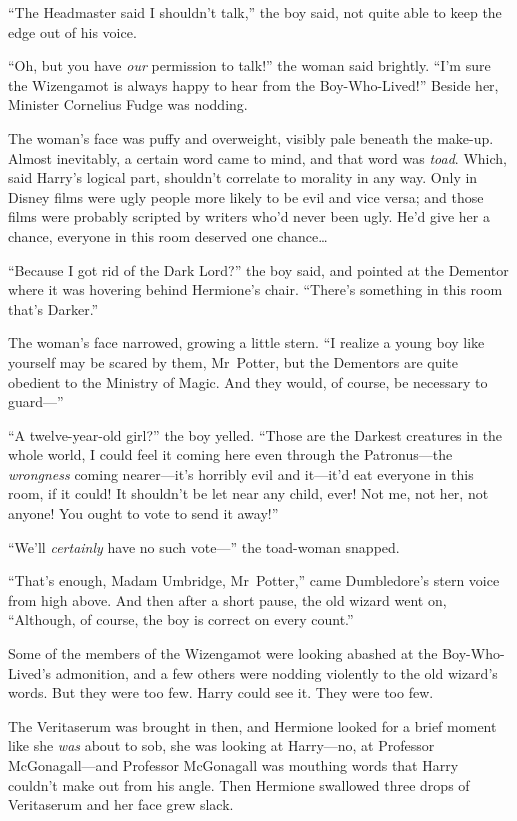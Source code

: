 “The Headmaster said I shouldn’t talk,” the boy said, not quite able to keep the edge out of his voice.

“Oh, but you have \emph{our} permission to talk!” the woman said brightly. “I’m sure the Wizengamot is always happy to hear from the Boy-Who-Lived!” Beside her, Minister Cornelius Fudge was nodding.

The woman’s face was puffy and overweight, visibly pale beneath the make-up. Almost inevitably, a certain word came to mind, and that word was \emph{toad}. Which, said Harry’s logical part, shouldn’t correlate to morality in any way. Only in Disney films were ugly people more likely to be evil and vice versa; and those films were probably scripted by writers who’d never been ugly. He’d give her a chance, everyone in this room deserved one chance…

“Because I got rid of the Dark Lord?” the boy said, and pointed at the Dementor where it was hovering behind Hermione’s chair. “There’s something in this room that’s Darker.”

The woman’s face narrowed, growing a little stern. “I realize a young boy like yourself may be scared by them, Mr~Potter, but the Dementors are quite obedient to the Ministry of Magic. And they would, of course, be necessary to guard—”

“A twelve-year-old girl?” the boy yelled. “Those are the Darkest creatures in the whole world, I could feel it coming here even through the Patronus—the \emph{wrongness} coming nearer—it’s horribly evil and it—it’d eat everyone in this room, if it could! It shouldn’t be let near any child, ever! Not me, not her, not anyone! You ought to vote to send it away!”

“We’ll \emph{certainly} have no such vote—” the toad-woman snapped.

“That’s enough, Madam Umbridge, Mr~Potter,” came Dumbledore’s stern voice from high above. And then after a short pause, the old wizard went on, “Although, of course, the boy is correct on every count.”

Some of the members of the Wizengamot were looking abashed at the Boy-Who-Lived’s admonition, and a few others were nodding violently to the old wizard’s words. But they were too few. Harry could see it. They were too few.

The Veritaserum was brought in then, and Hermione looked for a brief moment like she \emph{was} about to sob, she was looking at Harry—no, at Professor McGonagall—and Professor McGonagall was mouthing words that Harry couldn’t make out from his angle. Then Hermione swallowed three drops of Veritaserum and her face grew slack.


